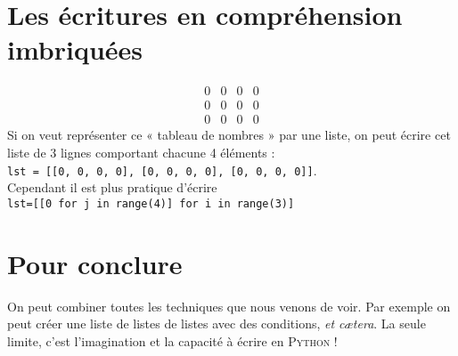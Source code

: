 \section{Les écritures en compréhension imbriquées}

$$\begin{matrix}
        0 & 0 & 0 & 0 \\0 & 0 & 0 & 0 \\0 & 0 & 0 & 0
    \end{matrix}$$
Si on veut représenter ce « tableau de nombres » par une liste, on peut écrire cet liste de 3 lignes comportant chacune 4 éléments :\\

\texttt{lst = [[0, 0, 0, 0], [0, 0, 0, 0], [0, 0, 0, 0]]}.\\

Cependant il est plus pratique d'écrire\\

\texttt{lst=[[0 for j in range(4)] for i in range(3)]}

\section{Pour conclure}

On peut combiner toutes les techniques que nous venons de voir. Par exemple on peut créer une liste de listes de listes avec des conditions, \textit{et c\ae tera}. La seule limite, c'est l'imagination et la capacité à écrire en \textsc{Python} !
